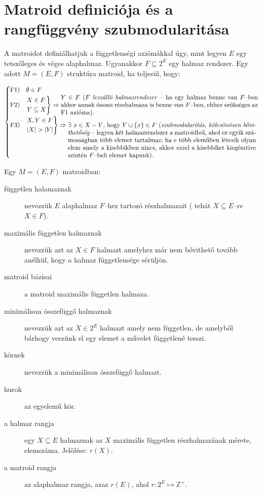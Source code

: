 \section{Matroid definiciója és a rangfüggvény szubmodularitása}

A matroidot definiálhatjuk a függetlenségi axiómákkal úgy, mint legyen $E$ egy
tetszőleges és véges alaphalmaz. Ugyanakkor $F \subseteq  2^E$ egy halmaz
rendszer. Egy adott $M=(E,F)$ struktúra matroid, ha teljesül, hogy:

\[
\begin{cases}
\mbox{F1}) &\emptyset \in F \\
\mbox{F2}) &\begin{rcases}
X \in F \\ 
Y \subseteq X 
\end{rcases} \Rightarrow \parbox[L]{11cm}{$Y \in F$
($F$ \emph{leszálló halmazrendszer} -- ha egy halmaz benne van $F$--ben akkor annak összes
részhalmaza is benne van $F$--ben, ehhez szükséges az F$1$ axióma).
} \\
\mbox{F3}) &\begin{rcases}
X,Y \in F\\
|X| > |Y| \\
\end{rcases} \Rightarrow\parbox[t]{10.5cm}{ $\exists~x \in X-Y$,~hogy $Y \cup \{x\}
\in F~($\emph{szubmodularitás, kölcsönösen bővithetőség} -- legyen két halmazrendszer
a matroidból, ahol ez egyik számosságban több elemet tartalmaz; ha e több
eleműben létezik olyan elem amely a kisebbikben nincs, akkor ezzel a kisebbiket
kiegésztive szintén $F$--beli elemet kapunk).}
\end{cases}
\]

Egy $M=(E,F)$ matroidban: 

\begin{description}
  \item[független halamaznak] nevezzük $E$ alaphalmaz $F$--hez tartozó
  részhalmazait ( tehát $X\subseteq E$--re $X \in F$).
  \item[maximális független halmaznak] nevezzük azt az $X \in F$ halmazt
  amelyhez már nem bővithető tovább anélkül, hogy a halmaz függetlensége
  sérüljön.
  \item[matroid bázisai] a matroid maximális független halmaza.
  \item[minimálisan összefüggő halmaznak] nevezzük azt az $X \in 2^E$ halmazt
  amely nem független, de amelyből bárhogy veszünk el egy elemet a művelet
  függetlené tesszi.
  \item[körnek] nevezzük a minimálisan összefüggő halmazt.
  \item[hurok] az egyelemű kör. 
  \item[a halmaz rangja] egy $X\subseteq E$ halmaznak az $X$ maximális
  független részhalmazának mérete, elemszáma. Jelölése: $r(X)$.
  \item[a matroid rangja] az alaphalmaz rangja, azaz $r(E)$, ahol $r:2^E \mapsto \mathbb{Z}^+$.
\end{description}

